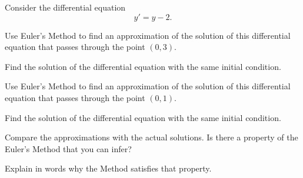 \begin{lesson}

%	
%
%	
%
\end{lesson}





\question
	Consider the differential equation
	$$ y' = y - 2 .$$
	
\begin{parts}
	\item Use Euler's Method to find an approximation of the solution of this differential equation that passes through the point $(0,3)$.
	\item Find the solution of the differential equation with the same initial condition.

	\item Use Euler's Method to find an approximation of the solution of this differential equation that passes through the point $(0,1)$.
	\item Find the solution of the differential equation with the same initial condition.

	\item Compare the approximations with the actual solutions. Is there a property of the Euler's Method that you can infer?
	\item Explain in words why the Method satisfies that property.
	

\end{parts}

